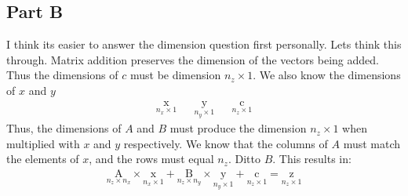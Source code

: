 \documentclass{article}
\begin{document}
\subsection*{Part B}
I think its easier to answer the dimension question first personally. Lets think this through. Matrix addition preserves the dimension of the vectors being added. Thus the dimensions of $c$ must be dimension $n_z\times 1$. We also know the dimensions of $x$ and $y$
\begin{align*}
\underset{n_x\times 1}{\mathrm{x}} && \underset{n_y \times 1}{\mathrm{y}} && \underset{n_z\times 1}{\mathrm{c}}
\end{align*}
Thus, the dimensions of $A$ and $B$ must produce the dimension $n_z\times 1$ when multiplied with $x$ and $y$ respectively. We know that the columns of $A$ must match the elements of $x$, and the rows must equal $n_z$. Ditto $B$. This results in:
\begin{align*}
\underset{n_z \times n_x}{\mathrm{A}} \times  \underset{n_x\times 1}{\mathrm{x}} + \underset{n_z \times n_y}{\mathrm{B}} \times \underset{n_y\times 1}{\mathrm{y}} + \underset{n_z\times 1}{\mathrm{c}} = \underset{n_z\times 1}{\mathrm{z}}
\end{align*}
\end{document}
